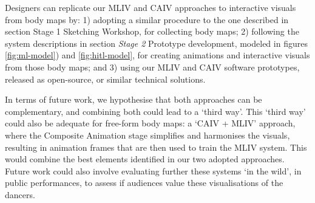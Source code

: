 Designers can replicate our MLIV and CAIV approaches to interactive visuals from body maps by: 1) adopting a similar procedure to the one described in section Stage 1 Sketching Workshop, for collecting body maps; 2) following the system descriptions in section \textit{Stage 2} Prototype development, modeled in figures \ref{fig:ml-model}) and \ref{fig:hitl-model}, for creating animations and interactive visuals from those body maps; and 3) using our MLIV and CAIV software prototypes, released as open-source, or similar technical solutions.

In terms of future work, we hypothesise that both approaches can be complementary, and combining both could lead to a ‘third way’. This ‘third way’ could also be adequate for free-form body maps: a ‘CAIV + MLIV’ approach, where the Composite Animation stage simplifies and harmonises the visuals, resulting in animation frames that are then used to train the MLIV system. This would combine the best elements identified in our two adopted approaches. Future work could also involve evaluating further these systems ‘in the wild’, in public performances, to assess if audiences value these visualisations of the dancers.
